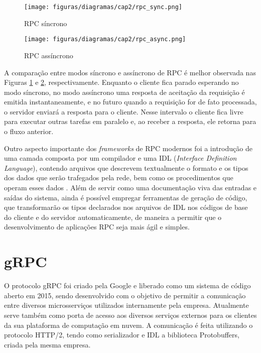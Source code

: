 \begin{figure}[ht]
    \centering
    \caption{RPC síncrono}
    \texttt{[image: figuras/diagramas/cap2/rpc\_sync.png]} 
    \label{fig:rpc_sync}
\end{figure}

\begin{figure}[ht]
    \centering
    \caption{RPC assíncrono}
    \texttt{[image: figuras/diagramas/cap2/rpc\_async.png]} 
    \label{fig:rpc_async}
\end{figure}

A comparação entre modos síncrono e assíncrono de RPC é melhor observada nas Figuras \ref{fig:rpc_sync} e \ref{fig:rpc_async}, respectivamente. Enquanto o cliente fica parado esperando no modo síncrono, no modo assíncrono uma resposta de aceitação da requisição é emitida instantaneamente, e no futuro quando a requisição for de fato processada, o servidor enviará a resposta para o cliente. Nesse intervalo o cliente fica livre para executar outras tarefas em paralelo e, ao receber a resposta, ele retorna para o fluxo anterior.

Outro aspecto importante dos \textit{frameworks} de RPC modernos foi a introdução de uma camada composta por um compilador e uma IDL (\textit{Interface Definition Language}), contendo arquivos que descrevem textualmente o formato e os tipos dos dados que serão trafegados pela rede, bem como os procedimentos que operam esses dados \cite{slee_thrift_nodate}. Além de servir como uma documentação viva das entradas e saídas do sistema, ainda é possível empregar ferramentas de geração de código, que transformarão os tipos declarados nos arquivos de IDL nos códigos de base do cliente e do servidor automaticamente, de maneira a permitir que o desenvolvimento de aplicações RPC seja mais ágil e simples.

\section{gRPC}

O protocolo gRPC foi criado pela Google e liberado como um sistema de código aberto em 2015, sendo desenvolvido com o objetivo de permitir a comunicação entre diversos microsserviços utilizados internamente pela empresa. Atualmente serve também como porta de acesso aos diversos serviços externos para os clientes da sua plataforma de computação em nuvem. A comunicação é feita utilizando o protocolo HTTP/2, tendo como serializador e IDL a biblioteca Protobuffers, criada pela mesma empresa.

